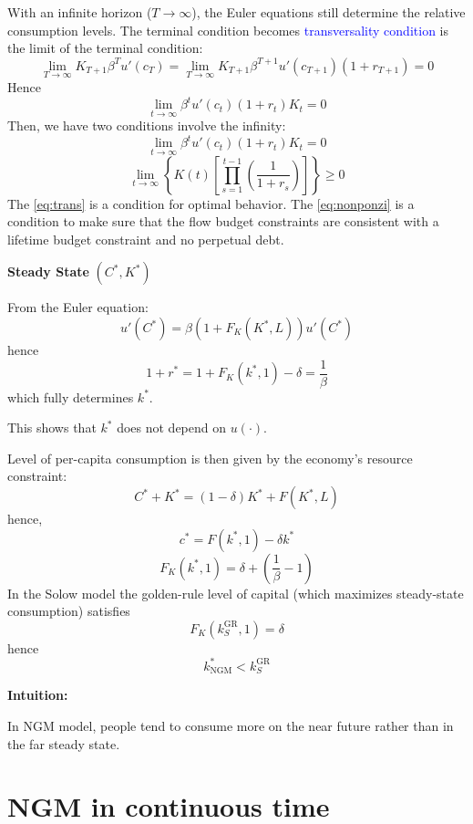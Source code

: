 With an infinite horizon ($T \to \infty$), the Euler equations still determine the relative consumption levels. The terminal condition becomes \textcolor{blue}{transversality condition} is the limit of the terminal condition:
\[ \lim_{T \to \infty} K_{T + 1}\beta^T u'(c_T) = \lim_{T \to \infty} K_{T + 1}\beta^{T + 1}u'(c_{T + 1})(1 + r_{T + 1}) = 0 \]
Hence
\[ \lim_{t \to \infty} \beta^t u'(c_t)(1 + r_t)K_t = 0 \]
Then, we have two conditions involve the infinity:
\begin{equation}
    \lim_{t \to \infty} \beta^t u'(c_t)(1 + r_t)K_t = 0 \label{eq:trans}
\end{equation}
\begin{equation}
    \lim_{t \to \infty} \left\{K(t)\left[\prod_{s = 1}^{t-1} \left(\frac{1}{1 + r_s}\right)\right]\right\} \geq 0 \label{eq:nonponzi}
\end{equation}
The \eqref{eq:trans} is a condition for optimal behavior. The \eqref{eq:nonponzi} is a condition to make sure that the flow budget constraints are consistent with a lifetime budget constraint and no perpetual debt.

\textbf{Steady State} $(C^*, K^*)$

From the Euler equation:
\[ u'(C^*) = \beta(1 + F_K(K^*, L))u'(C^*) \]
hence
\[ 1 + r^* = 1 + F_K(k^*, 1) - \delta = \frac{1}{\beta} \]
which fully determines $k^*$.

\begin{note}
This shows that $k^*$ does not depend on $u(\cdot)$.
\end{note}

Level of per-capita consumption is then given by the economy's resource constraint:
\[ C^* + K^* = (1 - \delta)K^* + F(K^*, L) \]
hence,
\[ c^* = F(k^*, 1) - \delta k^* \]
\[ F_K(k^*, 1) = \delta + \left(\frac{1}{\beta} - 1\right) \]
In the Solow model the golden-rule level of capital (which maximizes steady-state consumption) satisfies
\[ F_K(k_S^{\text{GR}}, 1) = \delta \]
hence
\[ k^*_{\text{NGM}} < k_S^{\text{GR}} \]

\begin{note}
\textbf{Intuition:}

In NGM model, people tend to consume more on the near future rather than in the far steady state.
\end{note}

\section{NGM in continuous time}

